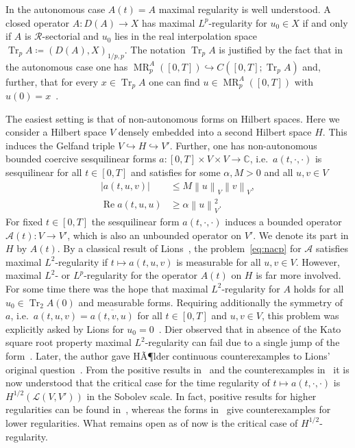 \documentclass[reqno,a4paper,final]{amsart}
\numberwithin{equation}{section}
\theoremstyle{definition}
\begin{document}
	In the autonomous case $A(t) = A$ maximal regularity is well understood. A closed operator $A\colon D(A) \to X$ has maximal $L^p$-regularity for $u_0 \in X$ if and only if $A$ is $\mathcal{R}$-sectorial and $u_0$ lies in the real interpolation space $\operatorname{Tr}_p A \coloneqq (D(A), X)_{1/p,p}$. The notation $\operatorname{Tr}_p A$ is justified by the fact that in the autonomous case one has $\operatorname{MR}_p^A([0,T]) \hookrightarrow C([0,T];\operatorname{Tr}_p A)$ and, further, that for every $x \in \operatorname{Tr}_p A$ one can find $u \in \operatorname{MR}_p^A([0,T])$ with $u(0) = x$~\cite[Theorem~III.4.10.2]{Ama95}.
	
	The easiest setting is that of non-autonomous forms on Hilbert spaces. Here we consider a Hilbert space $V$ densely embedded into a second Hilbert space $H$. This induces the Gelfand triple $V \hookrightarrow H \hookrightarrow V'$. Further, one has non-autonomous bounded coercive sesquilinear forms $a\colon [0,T] \times V \times V \to {\mathbb{C}}$, i.e.\ $a(t,\cdot,\cdot)$ is sesquilinear for all $t \in [0,T]$ and satisfies for some $\alpha, M > 0$ and all $u, v \in V$
	\begin{equation*}
		\tag{A}
		\label{eq:form_assumptions}
		\begin{split}
			{\left\lvert{a(t,u,v)}\right\rvert} & \le M {\left\lVert{u}\right\rVert}_V {\left\lVert{v}\right\rVert}_V, \\
			{\operatorname{Re}} a(t,u,u) & \ge \alpha {\left\lVert{u}\right\rVert}_V^2.
		\end{split}
	\end{equation*}
	For fixed $t \in [0,T]$ the sesquilinear form $a(t,\cdot,\cdot)$ induces a bounded operator $\mathcal{A}(t)\colon V \to V'$, which is also an unbounded operator on $V'$. We denote its part in $H$ by $A(t)$. By a classical result of Lions~\cite[p.~513, Theorem~2]{DauLio92}, the problem~\eqref{eq:nacp} for $\mathcal{A}$ satisfies maximal $L^2$-regularity if $t \mapsto a(t,u,v)$ is measurable for all $u, v \in V$. However, maximal $L^2$- or $L^p$-regularity for the operator $A(t)$ on $H$ is far more involved. For some time there was the hope that maximal $L^2$-regularity for $A$ holds for all $u_0 \in \operatorname{Tr}_2 A(0)$ and measurable forms. Requiring additionally the symmetry of $a$, i.e.\ $a(t,u,v) = \overline{a(t,v,u)}$ for all $t \in [0,T]$ and $u, v \in V$, this problem was explicitly asked by Lions for $u_0 = 0$~\cite[p.~68]{Lio61}. Dier observed that in absence of the Kato square root property maximal $L^2$-regularity can fail due to a single jump of the form~\cite[Section~5.2]{Die14}. Later, the author gave HÃ¶lder continuous counterexamples to Lions' original question~\cite{Fac16c}. From the positive results in~\cite{DieZac16} and the counterexamples in~\cite{Fac16c} it is now understood that the critical case for the time regularity of $t \mapsto a(t, \cdot, \cdot)$ is $H^{1/2}(\mathcal{L}(V,V'))$ in the Sobolev scale. In fact, positive results for higher regularities can be found in~\cite{DieZac16}, whereas the forms in~\cite{Fac16c} give counterexamples for lower regularities. What remains open as of now is the critical case of $H^{1/2}$-regularity.
	
\end{document}
